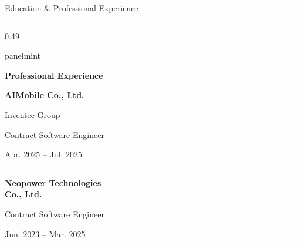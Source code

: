 \documentclass[aspectratio=169,10pt]{beamer}
\begin{document}
\begin{frame}{Education \& Professional Experience}
\begin{columns}[T,onlytextwidth]
    \begin{column}{0.49\textwidth}
      \begin{beamercolorbox}[
        rounded=true,sep=0.20cm,wd=\linewidth
      ]{panelmint}

        {\normalsize\bfseries\color{Accent}
          Professional Experience}\par
        \vspace{0.24cm}

        {\small\bfseries
          AIMobile Co., Ltd.}\par
        {\scriptsize\color{Muted}
          Inventec Group}\par
        \vspace{0.06cm}
        {\small
          Contract Software Engineer}\par
        \vspace{0.05cm}
        {\scriptsize\color{Muted}
          Apr. 2025 -- Jul. 2025}\par

        \vspace{0.26cm}
        {\color{Divider}\rule{0.92\linewidth}{0.4pt}}
        \vspace{0.19cm}

        {\small\bfseries
          Neopower Technologies\\Co., Ltd.}\par
        \vspace{0.06cm}
        {\small
          Contract Software Engineer}\par
        \vspace{0.05cm}
        {\scriptsize\color{Muted}
          Jun. 2023 -- Mar. 2025}\par

      \end{beamercolorbox}
    \end{column}

  \end{columns}
\end{frame}
\end{document}
